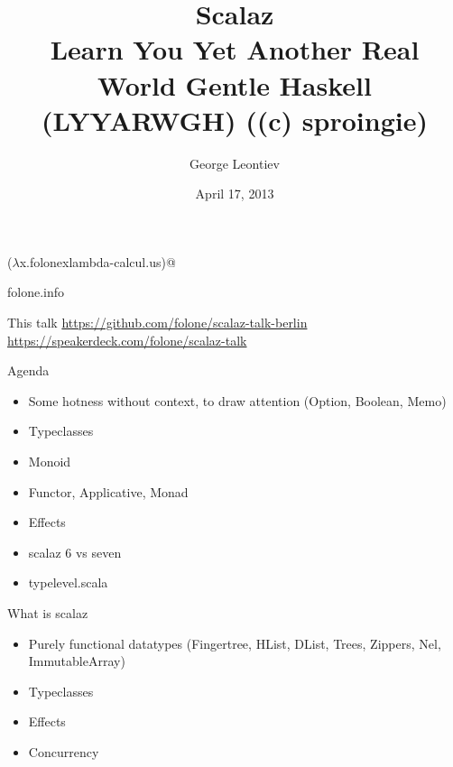 \documentclass{beamer}
\title[Scalaz]{Scalaz\\Learn You Yet Another Real World Gentle Haskell (LYYARWGH) ((c) sproingie)}
\author{George Leontiev}
\institute{deltamethod GmbH}
\date{April 17, 2013}
\begin{document}
\begin{frame}
\titlepage
\centerline{($\lambda$x.folonexlambda-calcul.us)@}
\centerline{folone.info}
\end{frame}

\begin{frame}{This talk}
  \url{https://github.com/folone/scalaz-talk-berlin}\newline
  \url{https://speakerdeck.com/folone/scalaz-talk}
\end{frame}

\begin{frame}{Agenda}
  \begin{itemize}
    \item Some hotness without context, to draw attention (Option, Boolean, Memo)
    \item Typeclasses
    \item Monoid
    \item Functor, Applicative, Monad
    \item Effects
    \item scalaz 6 vs seven
    \item typelevel.scala
  \end{itemize}
\end{frame}

\begin{frame}{What is scalaz}
  \begin{itemize}
    \item Purely functional datatypes (Fingertree, HList, DList, Trees, Zippers, Nel, ImmutableArray)
    \item Typeclasses
    \item Effects
    \item Concurrency
  \end{itemize}
\end{frame}
\end{document}

